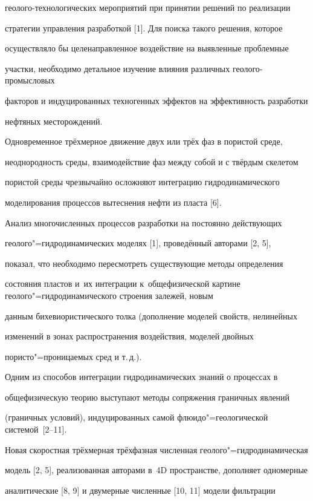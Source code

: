 геолого-технологических мероприятий при принятии решений по реализации

стратегии управления разработкой [1]. Для поиска такого решения, которое

осуществляло бы целенаправленное воздействие на выявленные проблемные

участки, необходимо детальное изучение влияния различных геолого-промысловых

факторов и индуцированных техногенных эффектов на эффективность разработки

нефтяных месторождений.



Одновременное трёхмерное движение двух или трёх фаз в пористой среде,

неоднородность среды, взаимодействие фаз между собой и с твёрдым скелетом

пористой среды чрезвычайно осложняют интеграцию гидродинамического

моделирования процессов вытеснения нефти из пласта [6].

Анализ многочисленных процессов разработки на постоянно действующих

геолого"=гидродинамических моделях [1], проведённый авторами [2, 5],

показал, что необходимо пересмотреть существующие методы определения

состояния пластов и~их интеграции к~общефизической картине геолого"=гидродинамического строения залежей, новым

данным бихевиористического толка (дополнение моделей свойств, нелинейных

изменений в зонах распространения воздействия, моделей двойных

пористо"=проницаемых сред и т.\,д.).



Одним из способов интеграции гидродинамических знаний о процессах в

общефизическую теорию выступают методы сопряжения граничных явлений

(граничных условий), индуцированных самой флюидо"=геологической системой~[2--11].

Новая скоростная трёхмерная трёхфазная численная геолого"=гидродинамическая

модель [2, 5], реализованная авторами в~4D пространстве, дополняет одномерные

аналитические [8, 9] и двумерные численные [10, 11] модели фильтрации

